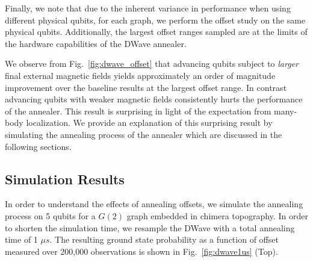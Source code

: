 \documentclass[prd,twocolumn,tightenlines,preprintnumbers,showpacs,superscriptaddress,notitlepage,nofootinbib,eqsecnum,floatfix,longbibliography]{revtex4}
\begin{document}
Finally, we note that due to the inherent variance in performance when using different physical qubits, for each graph, we perform the offset study on the same physical qubits.
Additionally, the largest offset ranges sampled are at the limits of the hardware capabilities of the DWave annealer.

We observe from Fig.~\ref{fig:dwave_offset} that advancing qubits subject to \textit{larger} final external magnetic fields yields approximately an order of magnitude improvement over the baseline results at the largest offset range.
In contrast advancing qubits with weaker magnetic fields consistently hurts the performance of the annealer.
This result is surprising in light of the expectation from many-body localization.
We provide an explanation of this surprising result by simulating the annealing process of the annealer which are discussed in the following sections.

\subsection{Simulation Results}

In order to understand the effects of annealing offsets, we simulate the annealing process on 5 qubits for a $G(2)$ graph embedded in chimera topography.
In order to shorten the simulation time, we resample the DWave with a total annealing time of 1 $\mu s$.
The resulting ground state probability as a function of offset measured over 200,000 observations is shown in Fig.~\ref{fig:dwave1us} (Top).
\end{document}
